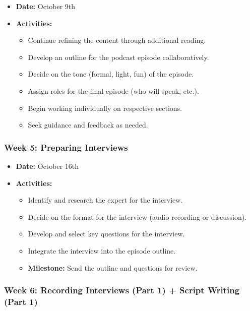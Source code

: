 \documentclass[
  letterpaper,
  DIV=11,
  numbers=noendperiod]{scrreprt}
\providecommand{\tightlist}{%
  \setlength{\itemsep}{0pt}\setlength{\parskip}{0pt}}\usepackage{longtable,booktabs,array}
\begin{document}
\begin{tcolorbox}
\begin{itemize}
\tightlist
\item
  \textbf{Date:} October 9th
\item
  \textbf{Activities:}

  \begin{itemize}
  \tightlist
  \item
    Continue refining the content through additional reading.
  \item
    Develop an outline for the podcast episode collaboratively.
  \item
    Decide on the tone (formal, light, fun) of the episode.
  \item
    Assign roles for the final episode (who will speak, etc.).
  \item
    Begin working individually on respective sections.
  \item
    Seek guidance and feedback as needed.
  \end{itemize}
\end{itemize}

\subsubsection{Week 5: Preparing
Interviews}\label{week-5-preparing-interviews}

\begin{itemize}
\tightlist
\item
  \textbf{Date:} October 16th
\item
  \textbf{Activities:}

  \begin{itemize}
  \tightlist
  \item
    Identify and research the expert for the interview.
  \item
    Decide on the format for the interview (audio recording or
    discussion).
  \item
    Develop and select key questions for the interview.
  \item
    Integrate the interview into the episode outline.
  \item
    \textbf{Milestone:} Send the outline and questions for review.
  \end{itemize}
\end{itemize}

\subsubsection{Week 6: Recording Interviews (Part 1) + Script Writing
(Part
1)}\label{week-6-recording-interviews-part-1-script-writing-part-1}


\end{tcolorbox}
\end{document}
